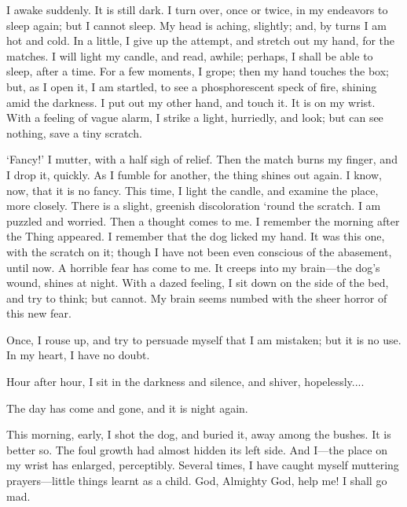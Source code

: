 
\clearpage
\label{ch:20}

\begin{ChapterStart}
\null\null
{}
\end{ChapterStart}

I awake suddenly. It is still dark. I turn over, once or twice, in my endeavors to sleep again; but I cannot sleep. My head is aching, slightly; and, by turns I am hot and cold. In a little, I give up the attempt, and stretch out my hand, for the matches. I will light my candle, and read, awhile; perhaps, I shall be able to sleep, after a time. For a few moments, I grope; then my hand touches the box; but, as I open it, I am startled, to see a phosphorescent speck of fire, shining amid the darkness. I put out my other hand, and touch it. It is on my wrist. With a feeling of vague alarm, I strike a light, hurriedly, and look; but can see nothing, save a tiny scratch.

‘Fancy!’ I mutter, with a half sigh of relief. Then the match burns my finger, and I drop it, quickly. As I fumble for another, the thing shines out again. I know, now, that it is no fancy. This time, I light the candle, and examine the place, more closely. There is a slight, greenish discoloration ‘round the scratch. I am puzzled and worried. Then a thought comes to me. I remember the morning after the Thing appeared. I remember that the dog licked my hand. It was this one, with the scratch on it; though I have not been even conscious of the abasement, until now. A horrible fear has come to me. It creeps into my brain---the dog’s wound, shines at night. With a dazed feeling, I sit down on the side of the bed, and try to think; but cannot. My brain seems numbed with the sheer horror of this new fear.

Once, I rouse up, and try to persuade myself that I am mistaken; but it is no use. In my heart, I have no doubt.

Hour after hour, I sit in the darkness and silence, and shiver, hopelessly....

The day has come and gone, and it is night again.

This morning, early, I shot the dog, and buried it, away among the bushes. It is better so. The foul growth had almost hidden its left side. And I---the place on my wrist has enlarged, perceptibly. Several times, I have caught myself muttering prayers---little things learnt as a child. God, Almighty God, help me! I shall go mad.


